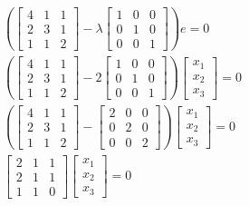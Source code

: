 \documentclass{article}
\begin{document}
\begin{align*}
    \left(
\begin{bmatrix}
4 & 1 & 1\\
2 & 3 & 1\\
1 & 1 & 2
\end{bmatrix}
- \lambda
\begin{bmatrix}
1 & 0 & 0\\
0 & 1 & 0\\
0 & 0 & 1
\end{bmatrix}
    \right)
    e = 0\\
        \left(
\begin{bmatrix}
4 & 1 & 1\\
2 & 3 & 1\\
1 & 1 & 2
\end{bmatrix}
- 2
\begin{bmatrix}
1 & 0 & 0\\
0 & 1 & 0\\
0 & 0 & 1
\end{bmatrix}
    \right)
    \begin{bmatrix}
        x_1\\x_2\\x_3
    \end{bmatrix} = 0\\
            \left(
\begin{bmatrix}
4 & 1 & 1\\
2 & 3 & 1\\
1 & 1 & 2
\end{bmatrix}
-
\begin{bmatrix}
2 & 0 & 0\\
0 & 2 & 0\\
0 & 0 & 2
\end{bmatrix}
    \right)
    \begin{bmatrix}
        x_1\\x_2\\x_3
    \end{bmatrix} = 0\\
\begin{bmatrix}
2 & 1 & 1\\
2 & 1 & 1\\
1 & 1 & 0
\end{bmatrix}
    \begin{bmatrix}
        x_1\\x_2\\x_3
    \end{bmatrix} = 0
\end{align*}
\end{document}
